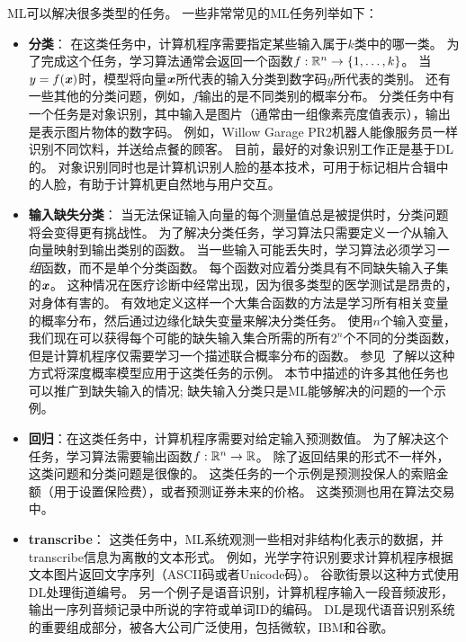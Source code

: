 \gls{ML}可以解决很多类型的任务。
一些非常常见的\gls{ML}任务列举如下：
\begin{itemize}
    \item \textbf{分类}：
    在这类任务中，计算机程序需要指定某些输入属于$k$类中的哪一类。
    为了完成这个任务，学习算法通常会返回一个函数$f:\mathbb{R}^n \to \{1,\dots,k\}$。
    当$y=f(\boldsymbol{\mathit{x}})$时，模型将向量$\boldsymbol{\mathit{x}}$所代表的输入分类到数字码$y$所代表的类别。
    还有一些其他的分类问题，例如，$f$输出的是不同类别的概率分布。
    分类任务中有一个任务是对象识别，其中输入是图片（通常由一组像素亮度值表示），输出是表示图片物体的数字码。
    例如，Willow Garage PR2机器人能像服务员一样识别不同饮料，并送给点餐的顾客\citep{Goodfellow2010}。
    目前，最好的对象识别工作正是基于\gls{DL}的\citep{Krizhevsky-2012-small,Ioffe+Szegedy-2015}。
    对象识别同时也是计算机识别人脸的基本技术，可用于标记相片合辑中的人脸\citep{Taigman-et-al-CVPR2014}，有助于计算机更自然地与用户交互。
    
    \item \textbf{输入缺失分类}：
    当无法保证输入向量的每个测量值总是被提供时，分类问题将会变得更有挑战性。
    为了解决分类任务，学习算法只需要定义\emph{一个}从输入向量映射到输出类别的函数。
    当一些输入可能丢失时，学习算法必须学习\emph{一组}函数，而不是单个分类函数。
    每个函数对应着分类具有不同缺失输入子集的$\boldsymbol{\mathit{x}}$。
    这种情况在医疗诊断中经常出现，因为很多类型的医学测试是昂贵的，对身体有害的。
    有效地定义这样一个大集合函数的方法是学习所有相关变量的概率分布，然后通过边缘化缺失变量来解决分类任务。 
    使用$n$个输入变量，我们现在可以获得每个可能的缺失输入集合所需的所有$2^n$个不同的分类函数，但是计算机程序仅需要学习一个描述联合概率分布的函数。
    参见~\cite{Goodfellow-et-al-NIPS2013}了解以这种方式将深度概率模型应用于这类任务的示例。 
    本节中描述的许多其他任务也可以推广到缺失输入的情况; 缺失输入分类只是\gls{ML}能够解决的问题的一个示例。
    

    \item \textbf{回归}：在这类任务中，计算机程序需要对给定输入预测数值。
    为了解决这个任务，学习算法需要输出函数$f:\mathbb{R}^n \to \mathbb{R}$。
    除了返回结果的形式不一样外，这类问题和分类问题是很像的。
    这类任务的一个示例是预测投保人的索赔金额（用于设置保险费），或者预测证券未来的价格。
    这类预测也用在算法交易中。
    
    \item \textbf{\gls{transcribe}}：
    这类任务中，\gls{ML}系统观测一些相对非结构化表示的数据，并\gls{transcribe}信息为离散的文本形式。
    例如，光学字符识别要求计算机程序根据文本图片返回文字序列（ASCII码或者Unicode码）。
    谷歌街景以这种方式使用\gls{DL}处理街道编号\citep{Goodfellow+et+al-ICLR2014a}。
    另一个例子是语音识别，计算机程序输入一段音频波形，输出一序列音频记录中所说的字符或单词ID的编码。
    \gls{DL}是现代语音识别系统的重要组成部分，被各大公司广泛使用，包括微软，IBM和谷歌\citep{deepSpeechReviewSPM2012}。


\end{itemize}
